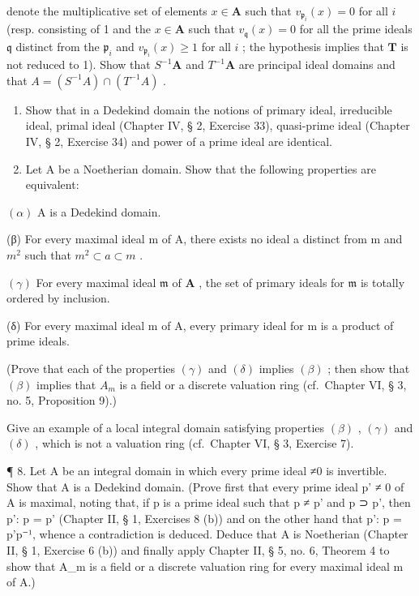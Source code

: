 denote the multiplicative set of elements \(x \in \mathbf{A}\) such that \(v_{\mathfrak{p}_i}(x) = 0\) for all \(i\) (resp. consisting of 1 and the \(x \in \mathbf{A}\) such that \(v_{\mathfrak{q}}(x) = 0\) for all the prime ideals \(\mathfrak{q}\) distinct from the \(\mathfrak{p}_i\) and \(v_{\mathfrak{p}_i}(x) \geqslant 1\) for all \(i\) ; the hypothesis implies that \(\mathbf{T}\) is not reduced to 1). Show that \(S^{-1}\mathbf{A}\) and \(T^{-1}\mathbf{A}\) are principal ideal domains and that \(A = (S^{-1}A) \cap (T^{-1}A)\) .

\begin{enumerate}
\def\labelenumi{\arabic{enumi}.}
\setcounter{enumi}{5}
\item
  Show that in a Dedekind domain the notions of primary ideal, irreducible ideal, primal ideal (Chapter IV, § 2, Exercise 33), quasi-prime ideal (Chapter IV, § 2, Exercise 34) and power of a prime ideal are identical.
\item
  Let A be a Noetherian domain. Show that the following properties are equivalent:
\end{enumerate}

\((\alpha)\) A is a Dedekind domain.

(β) For every maximal ideal m of A, there exists no ideal a distinct from m and \(m^{2}\) such that \(m^{2} \subset a \subset m\) .

\((\gamma)\) For every maximal ideal \(\mathfrak{m}\) of \(\mathbf{A}\) , the set of primary ideals for \(\mathfrak{m}\) is totally ordered by inclusion.

(δ) For every maximal ideal m of A, every primary ideal for m is a product of prime ideals.

(Prove that each of the properties \((\gamma)\) and \((\delta)\) implies \((\beta)\) ; then show that \((\beta)\) implies that \(A_{m}\) is a field or a discrete valuation ring (cf.~Chapter VI, § 3, no. 5, Proposition 9).)

Give an example of a local integral domain satisfying properties \((\beta)\) , \((\gamma)\) and \((\delta)\) , which is not a valuation ring (cf.~Chapter VI, § 3, Exercise 7).

¶ 8. Let A be an integral domain in which every prime ideal ≠0 is invertible. Show that A is a Dedekind domain. (Prove first that every prime ideal p' ≠ 0 of A is maximal, noting that, if p is a prime ideal such that p ≠ p' and p ⊃ p', then p': p = p' (Chapter II, § 1, Exercises 8 (b)) and on the other hand that p': p = p'p⁻¹, whence a contradiction is deduced. Deduce that A is Noetherian (Chapter II, § 1, Exercise 6 (b)) and finally apply Chapter II, § 5, no. 6, Theorem 4 to show that A\_m is a field or a discrete valuation ring for every maximal ideal m of A.)

